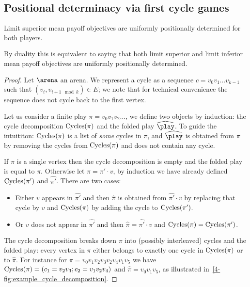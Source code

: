 \subsection*{Positional determinacy via first cycle games}
\begin{theorem}
\label{4-thm:mean_payoff_positional}
Limit superior mean payoff objectives are uniformly positionally determined for both players.
\end{theorem}
By duality this is equivalent to saying that both limit superior and limit inferior mean payoff objectives are uniformly positionally determined.

\begin{proof}
Let $\arena$ an arena.
We represent a cycle as a sequence $c = v_0 v_1 \dots v_{k-1}$ such that $(v_i, v_{i+1 \mod k}) \in E$;
we note that for technical convenience the sequence does not cycle back to the first vertex.

Let us consider a finite play $\pi = v_0 v_1 v_2\dots$,
we define two objects by induction: 
the cycle decomposition $\mathrm{Cycles}(\pi)$ and the folded play $\widehat{\play}$.
To guide the intuititon: $\mathrm{Cycles}(\pi)$ is a list of \textit{some} cycles in $\pi$, 
and $\widehat{\play}$ is obtained from $\pi$ by removing the cycles from $\mathrm{Cycles}(\pi)$
and does not contain any cycle.

If $\pi$ is a single vertex then the cycle decomposition is empty and the folded play is equal to $\pi$.
Otherwise let $\pi = \pi' \cdot v$, by induction we have already defined $\mathrm{Cycles}(\pi')$ and $\widehat{\pi'}$.
There are two cases:
\begin{itemize}
	\item Either $v$ appears in $\widehat{\pi'}$ and then $\widehat{\pi}$ is obtained from $\widehat{\pi'} \cdot v$ 
	by replacing that cycle by $v$ and $\mathrm{Cycles}(\pi)$ by adding the cycle to $\mathrm{Cycles}(\pi')$.
	\item Or $v$ does not appear in $\widehat{\pi'}$ and then $\widehat{\pi} = \widehat{\pi'} \cdot v$ 
	and $\mathrm{Cycles}(\pi) = \mathrm{Cycles}(\pi')$.
\end{itemize}
The cycle decomposition breaks down $\pi$ into (possibly interleaved) cycles and the folded play:
every vertex in $\pi$ either belongs to exactly one cycle in $\mathrm{Cycles}(\pi)$ or to $\widehat{\pi}$.
For instance for $\pi = v_0 v_1 v_2 v_3 v_2 v_4 v_1 v_5$
we have $\mathrm{Cycles}(\pi) = (c_1 = v_2 v_3 ; c_2 = v_1 v_2 v_4)$ and $\widehat{\pi} = v_0 v_1 v_5$,
as illustrated in~\cref{4-fig:example_cycle_decomposition}.


\end{proof}
